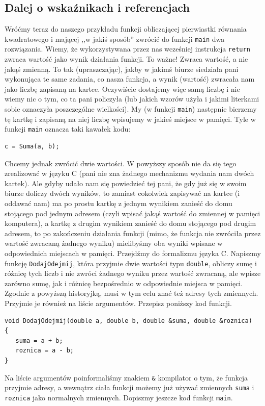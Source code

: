 \documentclass{instrukcja}
\begin{document}
\subsection*{Dalej o wskaźnikach i referencjach}
Wróćmy teraz do naszego przykładu funkcji obliczającej pierwiastki równania kwadratowego i mającej ,,w jakiś sposób'' zwrócić do funkcji {\tt main} dwa rozwiązania. Wiemy, że wykorzystywana przez nas wcześniej instrukcja {\tt return} zwraca wartość jako wynik działania funkcji. To ważne! Zwraca wartość, a nie jakąś zmienną. To tak (upraszczając), jakby w jakimś biurze siedziała pani wykonująca te same zadania, co nasza funkcja, a wynik (wartość) zwracała nam jako liczbę zapisaną na kartce. Oczywiście dostajemy więc samą liczbę i nie wiemy nic o tym, co ta pani policzyła (lub jakich wzorów użyła i jakimi literkami sobie oznaczyła poszczególne wielkości). My (w funkcji {\tt main}) następnie bierzemy tę kartkę i zapisaną na niej liczbę wpisujemy w jakieś miejsce w pamięci. Tyle w funkcji {\tt main} oznacza taki kawałek kodu:
\begin{verbatim}
c = Suma(a, b);
\end{verbatim}
Chcemy jednak zwrócić dwie wartości. W powyższy sposób nie da się tego zrealizować w języku C (pani nie zna żadnego mechanizmu wydania nam dwóch kartek). Ale gdyby udało nam się powiedzieć tej pani, że gdy już się w swoim biurze doliczy dwóch wyników, to zamiast cokolwiek zapisywać na kartce (i oddawać nam) ma po prostu kartkę z jednym wynikiem zanieść do domu stojącego pod jednym adresem (czyli wpisać jakąś wartość do zmiennej w pamięci komputera), a kartkę z drugim wynikiem zanieść do domu stojącego pod drugim adresem, to po zakończeniu działania funkcji (mimo, że funkcja nie zwróciła przez wartość zwracaną żadnego wyniku) mielibyśmy oba wyniki wpisane w odpowiednich miejscach w pamięci. Przejdźmy do formalizmu języka C. Napiszmy funkcję {\tt DodajOdejmij}, która przyjmie dwie wartości typu {\tt double}, obliczy sumę i różnicę tych liczb i nie zwróci żadnego wyniku przez wartość zwracaną, ale wpisze zarówno sumę, jak i różnicę bezpośrednio w odpowiednie miejsca w pamięci. Zgodnie z powyższą historyjką, musi w tym celu znać też adresy tych zmiennych. Przyjmie je również na liście argumentów. Przepisz poniższy kod funkcji.
\begin{verbatim}
void DodajOdejmij(double a, double b, double &suma, double &roznica)
{
   suma = a + b;
   roznica = a - b;
}
\end{verbatim}
Na liście argumentów poinformaliśmy znakiem {\tt \&} kompilator o tym, że funkcja przyjmie adresy, a wewnątrz ciała funkcji możemy już używać zmiennych {\tt suma} i {\tt roznica} jako normalnych zmiennych. Dopiszmy jeszcze kod funkcji {\tt main}.
\end{document}
